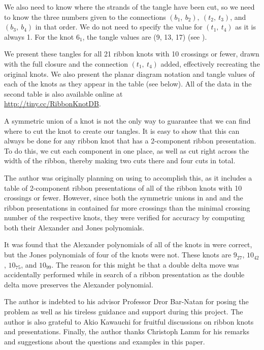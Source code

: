 \begin{paper}
We also need to know where the strands of the tangle have been cut, so we need
to know the three numbers given to the connections $(b_1,~b_2),~(t_2,~t_3)$, and
$(b_3,~b_4)$ in that order.
We do not need to specify the value for $(t_1,~t_4)$ as it is always 1.
For the knot $6_1$, the tangle values are (9, 13, 17) (see \figExample).

We present these tangles for all 21 ribbon knots with 10 crossings or fewer,
drawn with the full closure and the connection $(t_1,~t_4)$ added, effectively
recreating the original knots.
We also present the planar diagram notation and tangle values of each of the
knots as they appear in the table (see below).
All of the data in the second table is also available online at\\
\url{http://tiny.cc/RibbonKnotDB}.


A symmetric union of a knot is not the only way to guarantee that we can find
where to cut the knot to create our tangles.
It is easy to show that this can always be done for any ribbon knot that has a
2-component ribbon presentation.
To do this, we cut each component in one place, as well as cut right across the
width of the ribbon, thereby making two cuts there and four cuts in total.

The author was originally planning on using \cite{knots} to accomplish this, as
it includes a table of 2-component ribbon presentations of all of the ribbon
knots with 10 crossings or fewer.
However, since both the symmetric unions in \cite{one} and \cite{many} and the
ribbon presentations in \cite{knots} contained far more crossings than the
minimal crossing number of the respective knots, they were verified for accuracy
by computing both their Alexander and Jones polynomials.

It was found that the Alexander polynomials of all of the knots in \cite{knots}
were correct, but the Jones polynomials of four of the knots were not.
These knots are $9_{27}$, $10_{42}$, $10_{75}$, and $10_{99}$.
The reason for this might be that a double delta move was accidentally performed
while in search of a ribbon presentation as the double delta move preserves the
Alexander polynomial.


The author is indebted to his advisor Professor Dror Bar-Natan for posing the problem as well as his tireless guidance and support during this project.
The author is also grateful to Akio Kawauchi for fruitful discussions on ribbon
knots and presentations.
Finally, the author thanks Christoph Lamm for his remarks and suggestions about
the questions and examples in this paper.


\end{paper}
